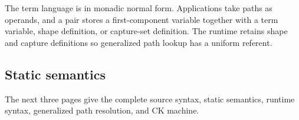 \documentclass[acmsmall,screen,nonacm]{acmart}
\newcommand{\plateheader}[2]{%
  \par\addvspace{1em}%
  \noindent\textbf{#1}%
  \if\relax\detokenize{#2}\relax\else
    \hfill{\setlength{\fboxsep}{3pt}\setlength{\fboxrule}{0.5pt}%
      \fbox{\(\strut #2\)}}%
  \fi\par
  \nobreak\addvspace{0.65em}%
}
\newcommand{\rulesetup}{%
  \small
  \smallrulenames
  \setlength{\afterruleskip}{1.45em plus 0.2em minus 0.1em}%
  \setlength{\labelminsep}{0.65em}%
  \renewcommand{\arraystretch}{1.15}%
  \renewcommand{\andalso}{\qquad}%
}
\begin{document}
The term language is in monadic normal form. Applications take paths as
operands, and a pair stores a first-component variable together with a term
variable, shape definition, or capture-set definition. The runtime retains
shape and capture definitions so generalized path lookup has a uniform
referent.

\subsection{Static semantics}

The next three pages give the complete source syntax, static semantics,
runtime syntax, generalized path resolution, and CK machine.

\clearpage
\begingroup
\setlength{\abovedisplayskip}{5pt plus 1pt minus 1pt}
\setlength{\belowdisplayskip}{5pt plus 1pt minus 1pt}
\setlength{\intextsep}{5pt}
\captionsetup{skip=6pt}
\rulesetup
\setlength{\afterruleskip}{0.65em plus 0.1em minus 0.05em}
\renewcommand{\plateheader}[2]{%
  \par\addvspace{0.45em}%
  \noindent\textbf{#1}%
  \if\relax\detokenize{#2}\relax\else
    \hfill{\setlength{\fboxsep}{3pt}\setlength{\fboxrule}{0.5pt}%
      \fbox{\(\strut #2\)}}%
  \fi\par
  \nobreak\addvspace{0.45em}%
}
\end{document}
